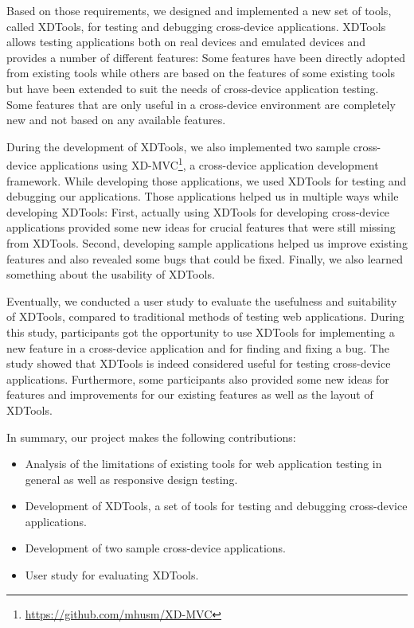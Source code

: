 Based on those requirements, we designed and implemented a new set of tools, called XDTools, for testing and debugging cross-device applications. XDTools allows testing applications both on real devices and emulated devices and provides a number of different features: Some features have been directly adopted from existing tools while others are based on the features of some existing tools but have been extended to suit the needs of cross-device application testing. Some features that are only useful in a cross-device environment are completely new and not based on any available features.

During the development of XDTools, we also implemented two sample cross-device applications using XD-MVC\footnote{\url{https://github.com/mhusm/XD-MVC}}, a cross-device application development framework. While developing those applications, we used XDTools for testing and debugging our applications. Those applications helped us in multiple ways while developing XDTools: First, actually using XDTools for developing cross-device applications provided some new ideas for crucial features that were still missing from XDTools. Second, developing sample applications helped us improve existing features and also revealed some bugs that could be fixed. Finally, we also learned something about the usability of XDTools.

Eventually, we conducted a user study to evaluate the usefulness and suitability of XDTools, compared to traditional methods of testing web applications. During this study, participants got the opportunity to use XDTools for implementing a new feature in a cross-device application and for finding and fixing a bug. The study showed that XDTools is indeed considered useful for testing cross-device applications. Furthermore, some participants also provided some new ideas for features and improvements for our existing features as well as the layout of XDTools.

In summary, our project makes the following contributions:
\begin{itemize}
	\item Analysis of the limitations of existing tools for web application testing in general as well as responsive design testing.
	\item Development of XDTools, a set of tools for testing and debugging cross-device applications.
	\item Development of two sample cross-device applications.
	\item User study for evaluating XDTools.
\end{itemize}

